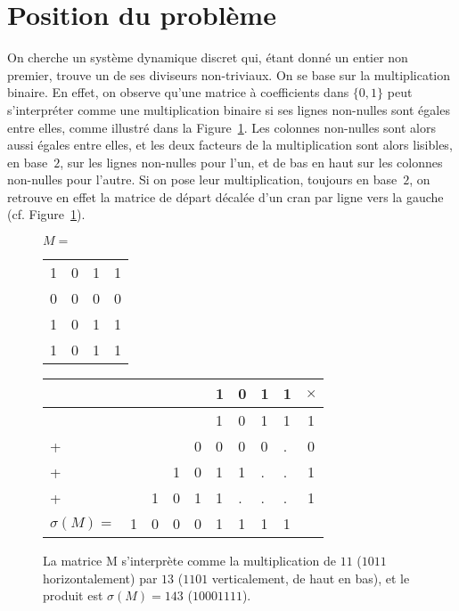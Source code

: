 \section{Position du problème}
\label{sec:introfacto}



On cherche un système dynamique discret qui, étant donné un entier non premier, trouve un de ses diviseurs non-triviaux. On se base sur la multiplication binaire. En effet, on observe qu'une matrice à coefficients dans $\{0,1\}$ peut s'interpréter comme une multiplication binaire si ses lignes non-nulles sont égales entre elles, comme illustré dans la Figure~\ref{fig:ExShift}. Les colonnes non-nulles sont alors aussi égales entre elles, et les deux facteurs de la multiplication sont alors lisibles, en base~$2$, sur les lignes non-nulles pour l'un, et de bas en haut sur les colonnes non-nulles pour l'autre. Si on pose leur multiplication, toujours en base~$2$, on retrouve en effet la matrice de départ décalée d'un cran par ligne vers la gauche (cf. Figure~\ref{fig:ExShift}).




\begin{figure}[h]
\centering
\begin{minipage}[]{0.25\linewidth}
$M=$
\begin{tabular}{cccc}
1&0&1&1\\
0&0&0&0\\
1&0&1&1\\
1&0&1&1\\
\end{tabular}

\end{minipage}
\quad
\begin{minipage}[]{0.4\linewidth}


\begin{tabular}{lllllllll|c}
&&&&&1&0&1&1&$\times$\\
\hline
&&&&&1&0&1&1&1\\
+&&&&0&0&0&0&.&0 \\
+&&&1&0&1&1&.&.&1\\
+&&1&0&1&1&.&.&.&1\\
\hline
$\sigma(M)=$&1&0&0&0&1&1&1&1&\\
\end{tabular}
\end{minipage}
\caption{La matrice M s'interprète comme la multiplication de $11$ ($1011$ horizontalement) par $13$ ($1101$ verticalement, de haut en bas), et le produit est $\sigma(M)=143$ ($10001111$).}
\label{fig:ExShift}
\end{figure}

